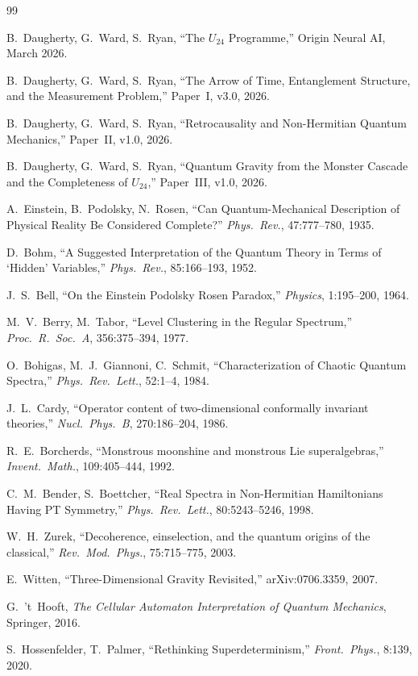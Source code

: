 \documentclass[12pt,a4paper]{article}
\theoremstyle{definition}\newtheorem{definition}[theorem]{Definition}
\theoremstyle{remark}\newtheorem{remark}[theorem]{Remark}
\begin{document}
\begin{thebibliography}{99}

 B.~Daugherty, G.~Ward, S.~Ryan, ``The $U_{24}$ Programme,''
  Origin Neural AI, March 2026.

 B.~Daugherty, G.~Ward, S.~Ryan, ``The Arrow of Time,
  Entanglement Structure, and the Measurement Problem,'' Paper~I, v3.0, 2026.

 B.~Daugherty, G.~Ward, S.~Ryan, ``Retrocausality and
  Non-Hermitian Quantum Mechanics,'' Paper~II, v1.0, 2026.

 B.~Daugherty, G.~Ward, S.~Ryan, ``Quantum Gravity from the
  Monster Cascade and the Completeness of $U_{24}$,'' Paper~III, v1.0, 2026.

 A.~Einstein, B.~Podolsky, N.~Rosen, ``Can Quantum-Mechanical
  Description of Physical Reality Be Considered Complete?'' \emph{Phys.\ Rev.},
  47:777--780, 1935.

 D.~Bohm, ``A Suggested Interpretation of the Quantum Theory
  in Terms of `Hidden' Variables,'' \emph{Phys.\ Rev.}, 85:166--193, 1952.

 J.~S.~Bell, ``On the Einstein Podolsky Rosen Paradox,''
  \emph{Physics}, 1:195--200, 1964.

 M.~V.~Berry, M.~Tabor, ``Level Clustering in the
  Regular Spectrum,'' \emph{Proc.\ R.\ Soc.\ A}, 356:375--394, 1977.

 O.~Bohigas, M.~J.~Giannoni, C.~Schmit, ``Characterization
  of Chaotic Quantum Spectra,'' \emph{Phys.\ Rev.\ Lett.}, 52:1--4, 1984.

 J.~L.~Cardy, ``Operator content of two-dimensional
  conformally invariant theories,'' \emph{Nucl.\ Phys.\ B}, 270:186--204, 1986.

 R.~E.~Borcherds, ``Monstrous moonshine and monstrous
  Lie superalgebras,'' \emph{Invent.\ Math.}, 109:405--444, 1992.

 C.~M.~Bender, S.~Boettcher, ``Real Spectra in
  Non-Hermitian Hamiltonians Having PT Symmetry,'' \emph{Phys.\ Rev.\ Lett.},
  80:5243--5246, 1998.

 W.~H.~Zurek, ``Decoherence, einselection, and the quantum
  origins of the classical,'' \emph{Rev.\ Mod.\ Phys.}, 75:715--775, 2003.

 E.~Witten, ``Three-Dimensional Gravity Revisited,''
  arXiv:0706.3359, 2007.

 G.~'t~Hooft, \emph{The Cellular Automaton Interpretation
  of Quantum Mechanics}, Springer, 2016.

 S.~Hossenfelder, T.~Palmer, ``Rethinking
  Superdeterminism,'' \emph{Front.\ Phys.}, 8:139, 2020.

\end{thebibliography}
\end{document}
